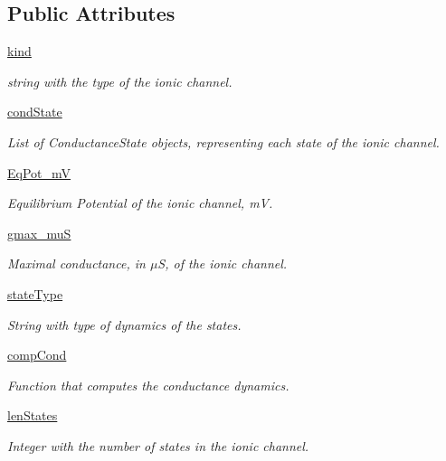 \subsection*{Public Attributes}
\begin{DoxyCompactItemize}
\item 
\hyperlink{class_channel_conductance_1_1_channel_conductance_a7bf3e28aab2160014358cde589f2ec39}{kind}
\begin{DoxyCompactList}\small\item\em string with the type of the ionic channel. \end{DoxyCompactList}\item 
\hyperlink{class_channel_conductance_1_1_channel_conductance_a628553cbc1efd93b30b0a15afd4417d9}{cond\-State}
\begin{DoxyCompactList}\small\item\em List of Conductance\-State objects, representing each state of the ionic channel. \end{DoxyCompactList}\item 
\hyperlink{class_channel_conductance_1_1_channel_conductance_a654a73b6cd5853b509e7f7fba060572b}{Eq\-Pot\-\_\-m\-V}
\begin{DoxyCompactList}\small\item\em Equilibrium Potential of the ionic channel, m\-V. \end{DoxyCompactList}\item 
\hyperlink{class_channel_conductance_1_1_channel_conductance_a80a0238a90b30b411c9381f682d0aeec}{gmax\-\_\-mu\-S}
\begin{DoxyCompactList}\small\item\em Maximal conductance, in $\mu$S, of the ionic channel. \end{DoxyCompactList}\item 
\hyperlink{class_channel_conductance_1_1_channel_conductance_aa3c889bb4528c3abe7b69862cf87119d}{state\-Type}
\begin{DoxyCompactList}\small\item\em String with type of dynamics of the states. \end{DoxyCompactList}\item 
\hyperlink{class_channel_conductance_1_1_channel_conductance_a0a91eec3fa2b1dfc66c6379943a5907f}{comp\-Cond}
\begin{DoxyCompactList}\small\item\em Function that computes the conductance dynamics. \end{DoxyCompactList}\item 
\hyperlink{class_channel_conductance_1_1_channel_conductance_ae217799d13e5d225af048b7ba503fde1}{len\-States}
\begin{DoxyCompactList}\small\item\em Integer with the number of states in the ionic channel. \end{DoxyCompactList}\end{DoxyCompactItemize}


